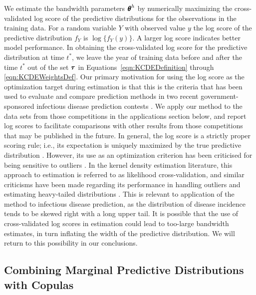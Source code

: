 \documentclass[times, doublespace]{simauth}\usepackage[]{graphicx}\usepackage[]{color}
\begin{document}
We estimate the bandwidth parameters $\btheta^h$ by numerically maximizing the
cross-validated log score of the predictive distributions for the observations
in the training data.  For a random variable $Y$ with observed value $y$ the
log score of the predictive distribution $f_Y$ is $\log\{f_Y(y)\}$.  A larger log
score indicates better model performance.  In obtaining the cross-validated log score for the
predictive distribution at time $t^*$, we leave the year
of training data before and after the time $t^*$ out of the set $\btau$ in
Equations~\eqref{eqn:KCDEDefinition} through \eqref{eqn:KCDEWeightsDef}.
Our primary motivation for using the log score as the optimization target during
estimation is that this is the criteria that has been used to evaluate and
compare prediction methods in two recent government-sponsored infectious disease
prediction contests
\cite{PandemicPredictionandForecastingScienceandTechnologyInteragencyWorkingGroup2015Announcement,
EpidemicPredictionInitiative2015Index}.
We apply our method to the data sets
from those competitions in the applications section below, and report log
scores to facilitate comparisons with other results from those
competitions that may be published in the future.
In general, the log score is a strictly proper scoring rule; i.e., its
expectation is uniquely maximized by the true predictive
distribution \cite{gneiting2007strictlyProperScoringRules}.
However, its use as an optimization criterion has been criticised for being
sensitive to outliers \cite{gneiting2007strictlyProperScoringRules}.  In
the kernel density estimation literature, this approach to estimation is referred to
as likelihood cross-validation, and similar criticisms have been made regarding
its performance in handling outliers and estimating heavy-tailed distributions
\cite{schuster1981nonconsistencyLCVforKDE,
scott1981MonteCarloStudyNonparDensityEstimators}.  This is relevant to application
of the method to infectious disease prediction, as the distribution of disease
incidence tends to be skewed right with a long upper tail.  It is possible that
the use of cross-validated log scores in estimation could lead to too-large
bandwidth estimates, in turn inflating the width of the predictive distribution.
We will return to this possibility in our conclusions.

\subsection{Combining Marginal Predictive Distributions with Copulas}
\label{subsec:Methods:Copulas}
\end{document}
